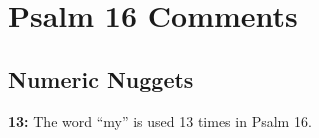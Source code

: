 \section{Psalm 16 Comments}

\subsection{Numeric Nuggets}
\textbf{13:} The word ``my'' is used 13 times in Psalm 16.